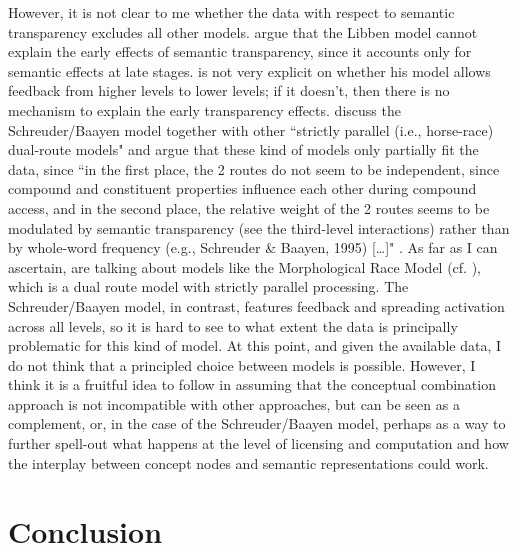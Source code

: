 However, it is not clear to me whether the data with respect to semantic
transparency excludes all other
models. \citet[662]{MarelliandLuzzatti:2012} argue that the Libben
model cannot explain the early effects of semantic transparency, since
it accounts only for semantic effects at late
stages. \citet{Libben:1998} is not very explicit on whether his model
allows feedback from higher levels to lower levels; if it doesn't,
then there is no mechanism to explain the early transparency
effects. \citet[662]{MarelliandLuzzatti:2012} discuss the
Schreuder/Baayen model together with other ``strictly parallel (i.e.,
horse-race) dual-route models" and argue that these kind of models
only partially fit the data, since ``in the first place, the 2
routes do not seem to be independent, since compound and constituent
properties influence each other during compound access, and in the
second place, the relative weight of the 2 routes seems to be
modulated by semantic transparency (see the third-level interactions)
rather than by whole-word frequency (e.g., Schreuder \& Baayen, 1995) [\dots]"
\citep[662]{MarelliandLuzzatti:2012}. As far as I can ascertain,
\citet[662]{MarelliandLuzzatti:2012} are talking about models like the
Morphological Race Model (cf. \citealt{FrauenfelderandSchreuder:1992}),
which is a dual route model with strictly parallel processing. The
Schreuder/Baayen model, in contrast, features feedback and spreading
activation across all levels, so it is hard to see to what extent the data
is principally problematic for this kind of model. At this point, and
given the available data, I do not think that a principled choice
between models is possible. However, I think it is a fruitful idea to
follow \citet{MarelliandLuzzatti:2012} in assuming that the conceptual
combination approach is not incompatible with other approaches, but
can be seen as a complement, or, in the case of the Schreuder/Baayen
model, perhaps as a way to further spell-out what happens at the level
of licensing and computation and how the interplay between concept
nodes and semantic representations could work. 


\section{Conclusion}
\label{sec:semTranPsych_conclusion}

